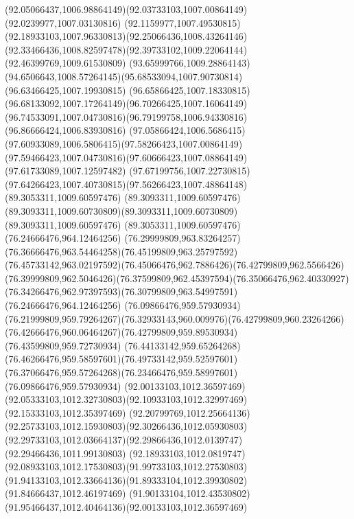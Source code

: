 {{	\curveto(92.05066437,1006.98864149)(92.03733103,1007.00864149)(92.0239977,1007.03130816)
	\curveto(92.1159977,1007.49530815)(92.18933103,1007.96330813)(92.25066436,1008.43264146)
	\curveto(92.33466436,1008.82597478)(92.39733102,1009.22064144)(92.46399769,1009.61530809)
	\lineto(93.65999766,1009.28864143)
	\curveto(94.6506643,1008.57264145)(95.68533094,1007.90730814)(96.63466425,1007.19930815)
	\curveto(96.65866425,1007.18330815)(96.68133092,1007.17264149)(96.70266425,1007.16064149)
	\curveto(96.74533091,1007.04730816)(96.79199758,1006.94330816)(96.86666424,1006.83930816)
	\curveto(97.05866424,1006.5686415)(97.60933089,1006.5806415)(97.58266423,1007.00864149)
	\curveto(97.59466423,1007.04730816)(97.60666423,1007.08864149)(97.61733089,1007.12597482)
	\curveto(97.67199756,1007.22730815)(97.64266423,1007.40730815)(97.56266423,1007.48864148)
	\moveto(89.3053311,1009.60597476)
	\curveto(89.3093311,1009.60597476)(89.3093311,1009.60730809)(89.3093311,1009.60730809)
	\lineto(89.3093311,1009.60597476)
	\lineto(89.3053311,1009.60597476)
	\moveto(76.24666476,964.12464256)
	\curveto(76.29999809,963.83264257)(76.36666476,963.54464258)(76.45199809,963.25797592)
	\curveto(76.45733142,963.02197592)(76.45066476,962.7886426)(76.42799809,962.5566426)
	\curveto(76.39999809,962.5046426)(76.37599809,962.45397594)(76.35066476,962.40330927)
	\curveto(76.34266476,962.97397593)(76.30799809,963.54997591)(76.24666476,964.12464256)
	\moveto(76.09866476,959.57930934)
	\curveto(76.21999809,959.79264267)(76.32933143,960.009976)(76.42799809,960.23264266)
	\curveto(76.42666476,960.06464267)(76.42799809,959.89530934)(76.43599809,959.72730934)
	\curveto(76.44133142,959.65264268)(76.46266476,959.58597601)(76.49733142,959.52597601)
	\curveto(76.37066476,959.57264268)(76.23466476,959.58997601)(76.09866476,959.57930934)
	\moveto(92.00133103,1012.36597469)
	\curveto(92.05333103,1012.32730803)(92.10933103,1012.32997469)(92.15333103,1012.35397469)
	\curveto(92.20799769,1012.25664136)(92.25733103,1012.15930803)(92.30266436,1012.05930803)
	\curveto(92.29733103,1012.03664137)(92.29866436,1012.0139747)(92.29466436,1011.99130803)
	\curveto(92.18933103,1012.0819747)(92.08933103,1012.17530803)(91.99733103,1012.27530803)
	\curveto(91.94133103,1012.33664136)(91.89333104,1012.39930802)(91.84666437,1012.46197469)
	\curveto(91.90133104,1012.43530802)(91.95466437,1012.40464136)(92.00133103,1012.36597469)
}
}
